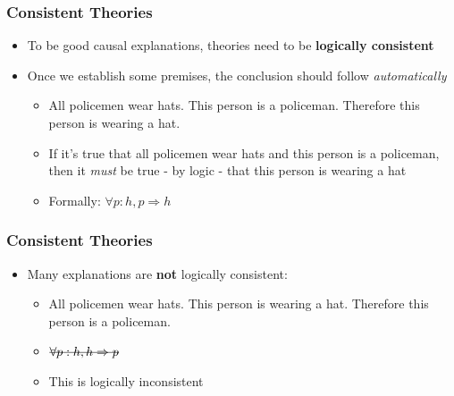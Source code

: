 \documentclass[xcolor=x11names,compress]{beamer}\usepackage[]{graphicx}\usepackage[]{color}
\renewcommand{\(}{\begin{columns}}
\renewcommand{\)}{\end{columns}}
\newcommand{\<}[1]{\begin{column}{#1}}
\renewcommand{\>}{\end{column}}
\begin{document}
\begin{frame}
\frametitle{Consistent Theories}
\begin{itemize}
\item To be good causal explanations, theories need to be \textbf{logically consistent}
\pause
\item Once we establish some premises, the conclusion should follow \textit{automatically}
\begin{itemize}
\item All policemen wear hats. This person is a policeman. Therefore this person is wearing a hat.
\pause
\item If it's true that all policemen wear hats and this person is a policeman, then it \textit{must} be true - by logic - that this person is wearing a hat
\pause
\item Formally: $\forall p:  h, p \Rightarrow h$
\end{itemize}
\end{itemize}
\end{frame}

\begin{frame}
\frametitle{Consistent Theories}
\begin{itemize}
\item Many explanations are \textbf{not} logically consistent:
\pause
\begin{itemize}
\item All policemen wear hats. This person is wearing a hat. Therefore this person is a policeman.
\pause
\item $\text{\sout{\ensuremath{\forall p:  h, h \Rightarrow p}}}$
\item This is logically inconsistent
\end{itemize}
\end{itemize}
\end{frame}
\end{document}
